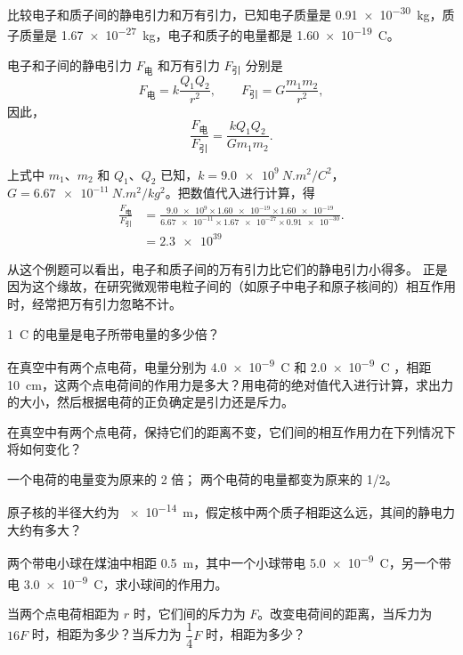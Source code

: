 \begin{example}
比较电子和质子间的静电引力和万有引力，已知电子质量是 \qty{0.91e-30}{kg}，质子质量是 \qty{1.67e-27}{kg}，电子和质子的电量都是 \qty{1.60e-19}{C}。
\end{example}
	
\begin{solution}
电子和子间的静电引力 $F_{\text{电}}$ 和万有引力 $F_{\text{引}}$ 分别是
\[F_{\text{电}} =k\frac{Q_1Q_2}{r^2} ,\qquad   F_{\text{引}}=G\frac{m_1m_2}{r^2}, \]
因此，
\[\frac{F_{\text{电}}}{F_{\text{引}}}=\frac{kQ_1Q_2}{Gm_1m_2}.\]

上式中 $m_1$、$m_2$ 和 $Q_1$、$Q_2$ 已知，$k=\qty{9.0e9}{N.m^2/C^2}$，$G=\qty{6.67e-11}{N.m^2/kg^2}$。把数值代入进行计算，得
\[\begin{split}
	\frac{F_\text{电}}{F_\text{引}}&=\frac{\num{9.0e9}\times\num{1.60e-19}\times\num{1.60e-19}}{\num{6.67e-11}\times \num{1.67e-27}\times \num{0.91e-30}}.\\
	&=\num{2.3e39}
\end{split}\]
\end{solution}

从这个例题可以看出，电子和质子间的万有引力比它们的静电引力小得多。
正是因为这个缘故，在研究微观带电粒子间的（如原子中电子和原子核间的）相互作用时，经常把万有引力忽略不计。

\begin{Practice}
\begin{question}
	\item \qty{1}{C} 的电量是电子所带电量的多少倍？
	\item 在真空中有两个点电荷，电量分别为 \qty{+4.0e-9}{C} 和 \qty{+2.0e-9}{C} ，相距 \qty{10}{cm}，这两个点电荷间的作用力是多大？用电荷的绝对值代入进行计算，求出力的大小，然后根据电荷的正负确定是引力还是斥力。
	\item 在真空中有两个点电荷，保持它们的距离不变，它们间的相互作用力在下列情况下将如何变化？
	\begin{tasks}
		\task 一个电荷的电量变为原来的 2 倍；
		\task 两个电荷的电量都变为原来的 1/2。
	\end{tasks}
	\item 原子核的半径大约为 \qty{e-14}{m}，假定核中两个质子相距这么远，其间的静电力大约有多大？
	\item 两个带电小球在煤油中相距 \qty{0.5}{m}，其中一个小球带电 \qty{5.0e-9}{C}，另一个带电 \qty{3.0e-9}{C}，求小球间的作用力。
	\item 当两个点电荷相距为 $r$ 时，它们间的斥力为 $F$。改变电荷间的距离，当斥力为 $16F$ 时，相距为多少？当斥力为 $\dfrac{1}{4}F$ 时，相距为多少？
\end{question}
\end{Practice}

